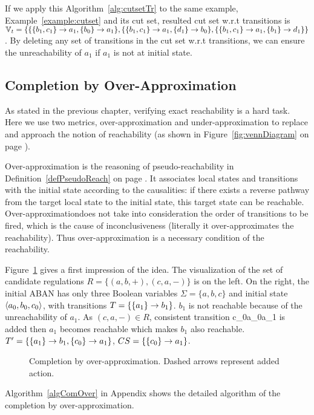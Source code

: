 If we apply this Algorithm~\ref{alg:cutsetTr} to the same example, Example~\ref{example:cutset} and its cut set, resulted cut set w.r.t transitions is $\mathbb{V}_t= \{\{\acm{b_1,c_1}{}{a_1},\acm{b_0}{}{a_1}\},\{\acm{b_1,c_1}{}{a_1},\acm{d_1}{}{b_0}\},\{\acm{b_1,c_1}{}{a_1},\acm{b_1}{}{d_1}\}\}$.
By deleting any set of transitions in the cut set w.r.t transitions, we can ensure the unreachability of $a_1$ if $a_1$ is not at initial state.

\subsection{Completion by Over-Approximation}
As stated in the previous chapter, verifying exact reachability is a hard task.
Here we use two metrics, over-approximation and under-approximation to replace and approach the notion of reachability (as shown in Figure~\ref{fig:vennDiagram} on page \pageref{fig:vennDiagram}).

Over-approximation is the reasoning of pseudo-reachability in Definition~\ref{defPseudoReach} on page \pageref{defPseudoReach}. 
It associates local states and transitions with the initial state according to the causalities: if there exists a reverse pathway from the target local state to the initial state, this target state can be reachable.
Over-approximationdoes not take into consideration the order of transitions to be fired, which is the cause of inconclusiveness (literally it over-approximates the reachability).
Thus over-approximation is a necessary condition of the reachability.

Figure~\ref{CompOv} gives a first impression of the idea.
The visualization of the set of candidate regulations $R=\{(a,b,+),(c,a,-)\}$ is on the left.
On the right, the initial ABAN has only three Boolean variables $\Sigma=\{a,b,c\}$ and initial state $\init{a_0,b_0,c_0}$, with transitions $T=\{\acm{a_1}{b_0}{b_1}\}$.
$b_1$ is not reachable because of the unreachability of $a_1$.
As $(c,a,-)\in R$, consistent transition \ac{c_0}{a_0}{a_1} is added then $a_1$ becomes reachable which makes $b_1$ also reachable.
$T'=\{\acm{a_1}{b_0}{b_1},\acm{c_0}{a_0}{a_1}\}$, $CS=\{\acm{c_0}{a_0}{a_1}\}$.

\begin{figure}[ht]
\centering

\caption[Completion by over-approximation]{Completion by over-approximation. Dashed arrows represent added action.}\label{CompOv}
\end{figure}
Algorithm~\ref{algComOver} in Appendix shows the detailed algorithm of the completion by over-approximation.

